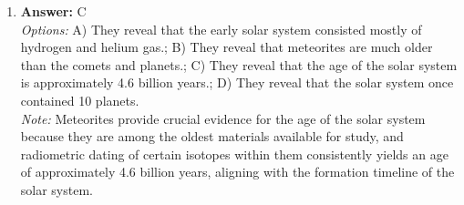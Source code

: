\documentclass[12pt]{article}
\begin{document}
\begin{enumerate}[label=\arabic*.]
\item \textbf{Answer:} C
\\ \textit{Options:} A) They reveal that the early solar system consisted mostly of hydrogen and helium gas.; B) They reveal that meteorites are much older than the comets and planets.; C) They reveal that the age of the solar system is approximately 4.6 billion years.; D) They reveal that the solar system once contained 10 planets.
\\ \textit{Note:} Meteorites provide crucial evidence for the age of the solar system because they are among the oldest materials available for study, and radiometric dating of certain isotopes within them consistently yields an age of approximately 4.6 billion years, aligning with the formation timeline of the solar system.
\end{enumerate}
\end{document}
